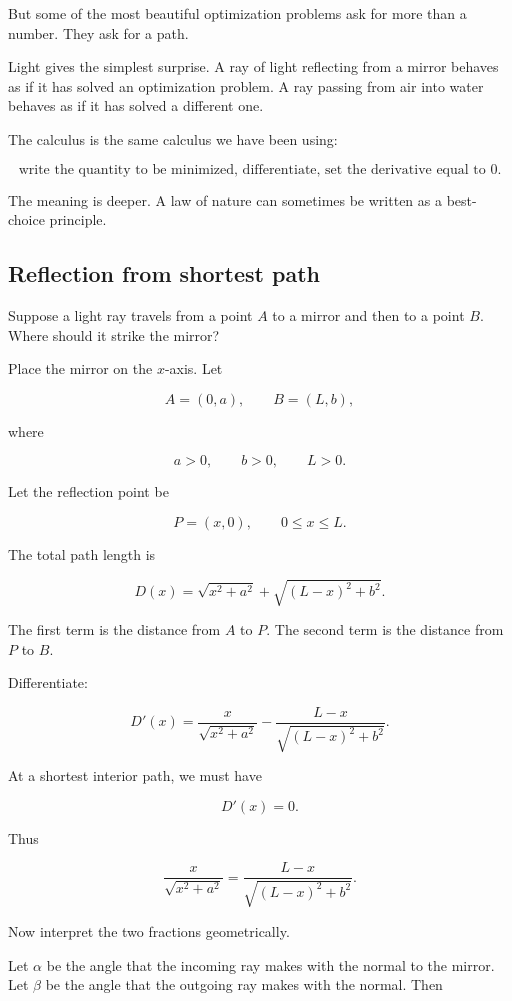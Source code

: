 But some of the most beautiful optimization problems ask for more than a number.
They ask for a path.

Light gives the simplest surprise.  A ray of light reflecting from a mirror behaves as
if it has solved an optimization problem.  A ray passing from air into water behaves as
if it has solved a different one.

The calculus is the same calculus we have been using:

\[
\text{write the quantity to be minimized, differentiate, set the derivative equal to }0.
\]

The meaning is deeper.  A law of nature can sometimes be written as a best-choice
principle.

\subsection{Reflection from shortest path}
\label{subsec:reflection-shortest-path}

Suppose a light ray travels from a point \(A\) to a mirror and then to a point \(B\).
Where should it strike the mirror?

Place the mirror on the \(x\)-axis.  Let

\[
A=(0,a),
\qquad
B=(L,b),
\]

where

\[
a>0,\qquad b>0,\qquad L>0.
\]

Let the reflection point be

\[
P=(x,0),
\qquad 0\le x\le L.
\]

The total path length is

\[
D(x)=\sqrt{x^2+a^2}+\sqrt{(L-x)^2+b^2}.
\]

The first term is the distance from \(A\) to \(P\).  The second term is the distance
from \(P\) to \(B\).

Differentiate:

\[
D'(x)
=
\frac{x}{\sqrt{x^2+a^2}}
-
\frac{L-x}{\sqrt{(L-x)^2+b^2}}.
\]

At a shortest interior path, we must have

\[
D'(x)=0.
\]

Thus

\[
\frac{x}{\sqrt{x^2+a^2}}
=
\frac{L-x}{\sqrt{(L-x)^2+b^2}}.
\]

Now interpret the two fractions geometrically.

Let \(\alpha\) be the angle that the incoming ray makes with the normal to the
mirror.  Let \(\beta\) be the angle that the outgoing ray makes with the normal.
Then

